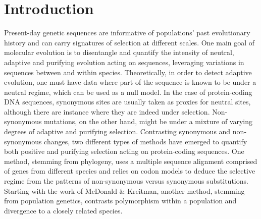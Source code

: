 \documentclass{article}
\begin{document}
    \section*{Introduction}
    Present-day genetic sequences are informative of populations' past evolutionary history and can carry signatures of selection at different scales.
    One main goal of molecular evolution is to disentangle and quantify the intensity of neutral, adaptive and purifying evolution acting on sequences, leveraging variations in sequences between and within species.
    Theoretically, in order to detect adaptive evolution, one must have data where part of the sequence is known to be under a neutral regime, which can be used as a null model.
    In the case of protein-coding DNA sequences, synonymous sites are usually taken as proxies for neutral sites, although there are instance where they are indeed under selection\cite{duret_expression_1999, duret_evolution_2002, galtier_codon_2018}.
    Non-synonymous mutations, on the other hand, might be under a mixture of varying degrees of adaptive and purifying selection.
    Contrasting synonymous and non-synonymous changes, two different types of methods have emerged to quantify both positive and purifying selection acting on protein-coding sequences.
    One method, stemming from phylogeny, uses a multiple sequence alignment comprised of genes from different species and relies on codon models to deduce the selective regime from the patterns of non-synonymous versus synonymous substitutions\cite{muse_likelihood_1994,goldman_codonbased_1994}.
    Starting with the work of McDonald \& Kreitman\cite{mcdonald_adaptative_1991}, another method, stemming from population genetics, contrasts polymorphism within a population and divergence to a closely related species.
\end{document}
